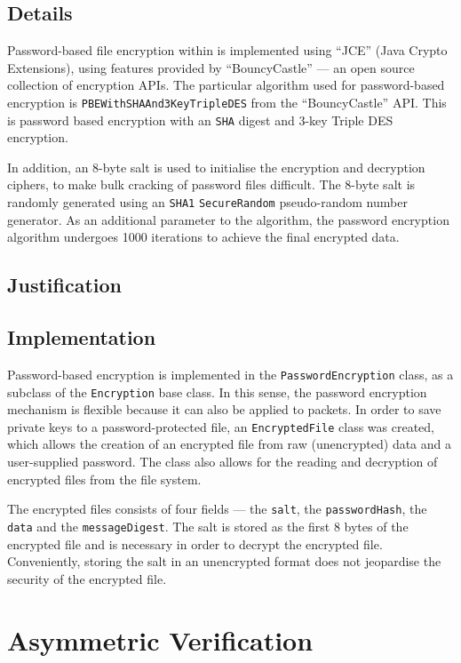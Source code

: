 \documentclass[a4paper,11pt]{article}
\begin{document}
\subsection{Details}
Password-based file encryption within \packageName{} is implemented using 
``JCE'' (Java Crypto Extensions), using features provided by ``BouncyCastle''
--- an open source collection of encryption APIs. The particular algorithm used 
for password-based encryption is \verb+PBEWithSHAAnd3KeyTripleDES+ from the 
``BouncyCastle'' API. This is password based encryption with an \verb+SHA+ 
digest and 3-key Triple DES encryption.

In addition, an 8-byte salt is used to initialise the encryption and decryption 
ciphers, to make bulk cracking of password files difficult. The 8-byte salt is 
randomly generated using an \verb+SHA1+ \verb+SecureRandom+ pseudo-random 
number generator. As an additional parameter to the algorithm, the password 
encryption algorithm undergoes 1000 iterations to achieve the final encrypted 
data.

\subsection{Justification}

\subsection{Implementation}
Password-based encryption is implemented in the \verb+PasswordEncryption+ class,
as a subclass of the \verb+Encryption+ base class. In this sense, the password
encryption mechanism is flexible because it can also be applied to 
\serviceName{} packets. In order to save private keys to a password-protected
file, an \verb+EncryptedFile+ class was created, which allows the creation of 
an encrypted file from raw (unencrypted) data and a user-supplied password. The 
class also allows for the reading and decryption of encrypted files from the 
file system.

The encrypted files consists of four fields --- the \verb+salt+, the 
\verb+passwordHash+, the \verb+data+ and the \verb+messageDigest+. The salt is 
stored as the first 8 bytes of the encrypted file and is necessary in order to
decrypt the encrypted file. Conveniently, storing the salt in an unencrypted 
format does not jeopardise the security of the encrypted file.

\section{Asymmetric Verification}
\end{document}
